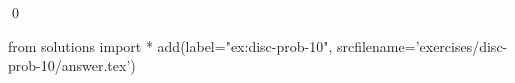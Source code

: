 
\begin{ex} 
  \label{ex:disc-prob-10}
  
  \qed
\end{ex} 
\begin{python0}
from solutions import *
add(label="ex:disc-prob-10",
    srcfilename='exercises/disc-prob-10/answer.tex') 
\end{python0}
